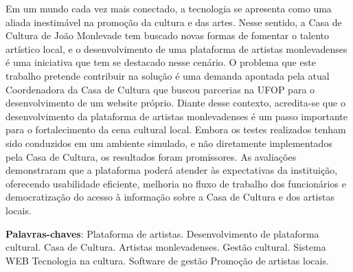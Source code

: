 \setlength{\absparsep}{18pt} %

\begin{resumo}
Em um mundo cada vez mais conectado, a tecnologia se apresenta como uma aliada inestimável na promoção da cultura e das artes. Nesse sentido, a Casa de Cultura de João Monlevade tem buscado novas formas de fomentar o talento artístico local, e o desenvolvimento de uma plataforma de artistas monlevadenses é uma iniciativa que tem se destacado nesse cenário. O problema que este trabalho pretende contribuir na solução é uma demanda apontada pela atual Coordenadora da Casa de Cultura que buscou parcerias na UFOP para o desenvolvimento de um website próprio. Diante desse contexto, acredita-se que o desenvolvimento da plataforma de artistas monlevadenses é um passo importante para o fortalecimento da cena cultural local. Embora os testes realizados tenham sido conduzidos em um ambiente simulado, e não diretamente implementados pela Casa de Cultura, os resultados foram promissores. As avaliações demonstraram que a plataforma poderá atender às expectativas da instituição, oferecendo usabilidade eficiente, melhoria no fluxo de trabalho dos funcionários e democratização do acesso à informação sobre a Casa de Cultura e dos artistas locais.


 \textbf{Palavras-chaves}:     
    Plataforma de artistas.
    Desenvolvimento de plataforma cultural.
    Casa de Cultura.
    Artistas monlevadenses.
    Gestão cultural.
    Sistema WEB
    Tecnologia na cultura.
    Software de gestão
    Promoção de artistas locais.
\end{resumo}

